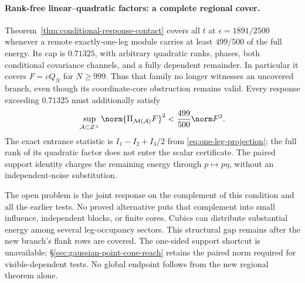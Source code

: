 \paragraph{Rank-free linear--quadratic factors: a complete regional cover.}
Theorem~\ref{thm:conditional-response-contact} covers all $t$ at
$\epsilon=1891/2500$ whenever a remote exactly-one-leg module carries
at least $499/500$ of the full energy. Its cap is $0.71325$, with
arbitrary quadratic ranks, phases, both conditional covariance channels,
and a fully dependent remainder. In particular it covers $F=cQ_N$
for $N\ge999$. Thus that family no longer witnesses an uncovered
branch, even though its coordinate-core obstruction remains valid.
Every response exceeding $0.71325$ must additionally satisfy
\[
 \sup_{\mathcal A\subset Z^\perp}
 \norm{\Pi_{\mathcal M(\mathcal A)}F}^2<\frac{499}{500}\norm F^2.
\]
The exact entrance statistic is
$I_1-I_2+I_3/2$ from \eqref{eq:one-leg-projection}; the full rank of
its quadratic factor does not enter the scalar certificate.
The paired support identity charges the remaining energy through
$p\mapsto p\eta$, without an independent-noise substitution.

The open problem is the joint response on the complement of this
condition and all the earlier tests. No proved alternative puts that
complement into small influence, independent blocks, or finite cores.
Cubics can distribute substantial energy among several leg-occupancy
sectors. This structural gap remains after the new branch's flank rows
are covered. The one-sided support shortcut is unavailable;
\S\ref{sec:gaussian-point-cone-reach} retains the paired norm required
for visible-dependent tests. No global endpoint follows from the new
regional theorem alone.
